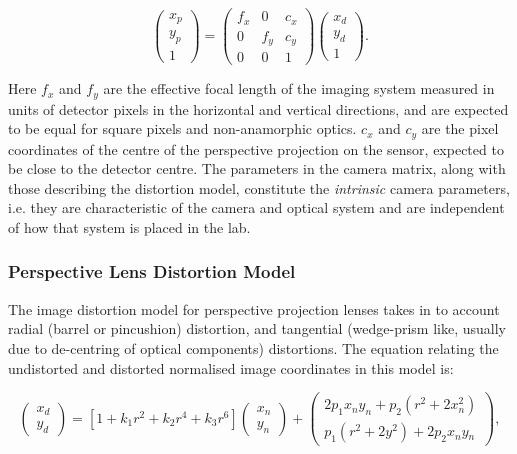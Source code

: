\documentclass[12pt]{article}
\begin{document}
\begin{equation}
\begin{pmatrix}x_p\\y_p\\1\end{pmatrix} = \begin{pmatrix}f_x & 0 & c_x \\ 0 & f_y & c_y\\0 & 0 & 1\end{pmatrix}\begin{pmatrix}x_d\\y_d\\1\end{pmatrix}.
\label{eqn:cammatrix}
\end{equation}

\noindent Here $f_x$ and $f_y$ are the effective focal length of the imaging system measured in units of detector pixels in the horizontal and vertical directions, and are  expected to be equal for square pixels and non-anamorphic optics. $c_x$ and $c_y$ are the pixel coordinates of the centre of the perspective projection on the sensor, expected to be close to the detector centre. The parameters in the camera matrix, along with those describing the distortion model, constitute the {\it intrinsic} camera parameters, i.e. they are characteristic of the camera and optical system and are independent of how that system is placed in the lab.

\subsubsection{Perspective Lens Distortion Model}

The image distortion model for perspective projection lenses takes in to account radial (barrel or pincushion) distortion, and tangential (wedge-prism like, usually due to de-centring of optical components) distortions. The equation relating the undistorted and distorted normalised image coordinates in this model is:

\begin{equation}
\begin{pmatrix}x_d\\y_d\end{pmatrix} = \left[ 1 + k_1r^2 + k_2r^4 + k_3r^6\right]\begin{pmatrix}x_n\\y_n\end{pmatrix} +  \begin{pmatrix}2p_1x_ny_n + p_2(r^2 + 2x_n^2)\\p_1(r^2 + 2y^2) + 2p_2x{_n}y{_n}\end{pmatrix},
\label{eqn:perspective_distortion}
\end{equation}
\end{document}
